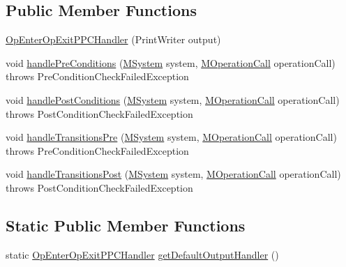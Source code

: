 \subsection*{Public Member Functions}
\begin{DoxyCompactItemize}
\item 
\hyperlink{classorg_1_1tzi_1_1use_1_1uml_1_1sys_1_1ppc_handling_1_1_op_enter_op_exit_p_p_c_handler_a46e6baa394bd40314fea19d6ef9ff88c}{Op\-Enter\-Op\-Exit\-P\-P\-C\-Handler} (Print\-Writer output)
\item 
void \hyperlink{classorg_1_1tzi_1_1use_1_1uml_1_1sys_1_1ppc_handling_1_1_op_enter_op_exit_p_p_c_handler_aad43b7e32882ad39eba65a5b9feb38d6}{handle\-Pre\-Conditions} (\hyperlink{classorg_1_1tzi_1_1use_1_1uml_1_1sys_1_1_m_system}{M\-System} system, \hyperlink{classorg_1_1tzi_1_1use_1_1uml_1_1sys_1_1_m_operation_call}{M\-Operation\-Call} operation\-Call)  throws Pre\-Condition\-Check\-Failed\-Exception 
\item 
void \hyperlink{classorg_1_1tzi_1_1use_1_1uml_1_1sys_1_1ppc_handling_1_1_op_enter_op_exit_p_p_c_handler_a2c894a05efa10a4cfc5637a7f160fb0e}{handle\-Post\-Conditions} (\hyperlink{classorg_1_1tzi_1_1use_1_1uml_1_1sys_1_1_m_system}{M\-System} system, \hyperlink{classorg_1_1tzi_1_1use_1_1uml_1_1sys_1_1_m_operation_call}{M\-Operation\-Call} operation\-Call)  throws Post\-Condition\-Check\-Failed\-Exception 
\item 
void \hyperlink{classorg_1_1tzi_1_1use_1_1uml_1_1sys_1_1ppc_handling_1_1_op_enter_op_exit_p_p_c_handler_a346b7d41477271d6dd554536f3833c30}{handle\-Transitions\-Pre} (\hyperlink{classorg_1_1tzi_1_1use_1_1uml_1_1sys_1_1_m_system}{M\-System} system, \hyperlink{classorg_1_1tzi_1_1use_1_1uml_1_1sys_1_1_m_operation_call}{M\-Operation\-Call} operation\-Call)  throws Pre\-Condition\-Check\-Failed\-Exception 
\item 
void \hyperlink{classorg_1_1tzi_1_1use_1_1uml_1_1sys_1_1ppc_handling_1_1_op_enter_op_exit_p_p_c_handler_a13a316fd924e01ce64206059866bad7a}{handle\-Transitions\-Post} (\hyperlink{classorg_1_1tzi_1_1use_1_1uml_1_1sys_1_1_m_system}{M\-System} system, \hyperlink{classorg_1_1tzi_1_1use_1_1uml_1_1sys_1_1_m_operation_call}{M\-Operation\-Call} operation\-Call)  throws Post\-Condition\-Check\-Failed\-Exception 
\end{DoxyCompactItemize}
\subsection*{Static Public Member Functions}
\begin{DoxyCompactItemize}
\item 
static \hyperlink{classorg_1_1tzi_1_1use_1_1uml_1_1sys_1_1ppc_handling_1_1_op_enter_op_exit_p_p_c_handler}{Op\-Enter\-Op\-Exit\-P\-P\-C\-Handler} \hyperlink{classorg_1_1tzi_1_1use_1_1uml_1_1sys_1_1ppc_handling_1_1_op_enter_op_exit_p_p_c_handler_a8ea6ac49194979e89e516d75a998ac1a}{get\-Default\-Output\-Handler} ()
\end{DoxyCompactItemize}


